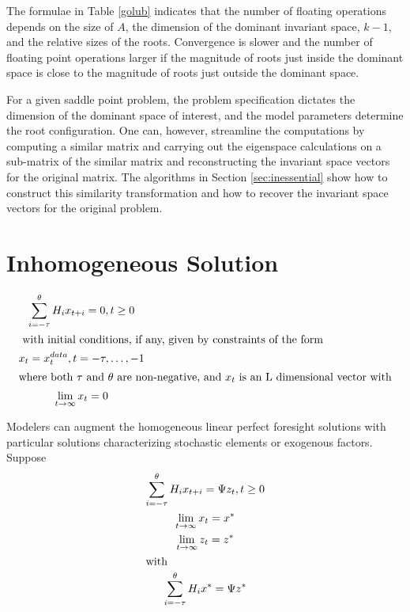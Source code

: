 \documentclass{article}
\begin{document}
{The formulae in Table \ref{golub} indicates that the 
number of floating operations depends on the size of  $A$, the dimension
of the dominant invariant space, $k-1$, and the relative sizes of the roots.
Convergence is slower and the number of floating point operations larger
if the magnitude of roots just inside the dominant space is close to the 
magnitude of roots just outside the dominant space.

For a given saddle point problem,  the problem
specification dictates the dimension of the dominant space 
of interest, and the model parameters determine the root configuration.
One can, however, streamline the computations by computing a similar matrix
and carrying out the eigenspace calculations on a sub-matrix of the similar
matrix and reconstructing the invariant space vectors for the original
matrix.
The algorithms in Section \ref{sec:inessential} show how to construct this
similarity transformation and how to recover the invariant space vectors for
the original problem.










\section{Inhomogeneous Solution}
\label{sec:inhomog}


\begin{gather}
\sum_{i= - \tau}^\theta { H_i  x_{ t + i } }= 0, t \geq 0 \label{eq:canonical}\\ \intertext{ with initial conditions, if any, given by constraints of the form}
x_t  =  x^{data}_t  ,  t =  - \tau, \ldots , -1\\ \intertext{where both $\tau$ and $\theta$ are non-negative, and $x_t$ is an L dimensional vector with}
\lim_{ t \rightarrow \infty } x_t  =  0
\end{gather}

Modelers can augment the homogeneous linear perfect foresight solutions with
particular solutions characterizing stochastic elements or exogenous factors.
Suppose
\begin{gather*}
\sum_{i= - \tau}^\theta { H_i  x_{ t + i } }= \Psi z_{t}, t \geq 0 \label{eq:noncanonical}\\
\lim_{ t \rightarrow \infty } x_t  =  x^\ast\\
\lim_{ t \rightarrow \infty } z_t  =  z^\ast \\ \intertext{with }
\sum_{i= - \tau}^\theta { H_i  x^\ast}= \Psi z^\ast
\end{gather*}



}
\end{document}

